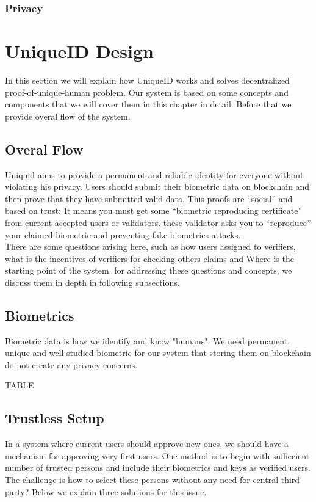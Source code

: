 \documentclass{article}
\begin{document}
\subsubsection{Privacy}



\section{ UniqueID Design}
In this section we will explain how UniqueID works and solves decentralized proof-of-unique-human problem. Our system is based on some concepts and components that we will cover them in this chapter in detail. Before that we provide overal flow of the system.

\subsection{Overal Flow}

  Uniquid aims to provide a permanent and reliable identity for everyone without violating his privacy.  Users should submit their biometric data on blockchain and then prove that they have submitted valid data. This proofs are “social” and based on trust: It means you must get some “biometric reproducing certificate” from current accepted users or validators. these validator asks you to “reproduce” your claimed biometric and preventing fake biometrics attacks.
  \\
  There are some questions arising here, such as how users assigned to verifiers, what is the incentives of verifiers for checking others claims and Where is the starting point of the system. for addressing these questions and concepts, we discuss them in depth in following subsections.
\subsection{Biometrics}
Biometric data is how we identify and know "humans". We need permanent, unique and well-studied biometric for our system that storing them on blockchain do not create any privacy concerns. 

TABLE


\subsection{Trustless Setup}
In a system where current users should approve new ones, we should have a mechanism for approving very first users. One method is to begin with suffiecient number of trusted persons and include their biometrics and keys as verified users. The challenge is how to select these persons without any need for central third party? Below we explain three solutions for this issue.
\end{document}
